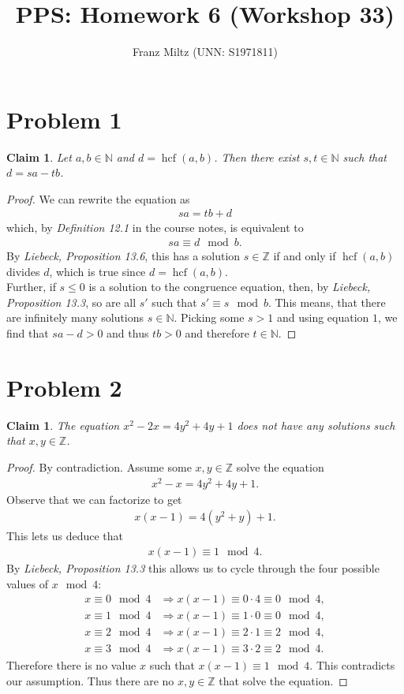\documentclass{article}
\title{PPS: Homework 6 (Workshop 33)}
\author{Franz Miltz (UNN: S1971811)}
\newcommand{\N}{\mathbb{N}}
\newcommand{\Z}{\mathbb{Z}}
\newtheorem{claim}[section]{Claim}
\DeclareMathOperator{\hcf}{hcf}
\begin{document}
\maketitle
\section*{Problem 1}
\begin{claim}
  Let $a,b\in\N$ and $d=\hcf(a,b)$. Then there exist $s,t\in\N$ such that $d=sa-tb$.
\end{claim}
\begin{proof}
  We can rewrite the equation as
  \begin{align}
    \label{eq:1}
    sa = tb + d
  \end{align}
  which, by \emph{Definition 12.1} in the course notes, is equivalent to
  \begin{align*}
    sa \equiv d \mod b.
  \end{align*}
  By \emph{Liebeck, Proposition 13.6}, this has a solution $s\in\Z$ if and only if $\hcf(a,b)$ divides $d$, which is true since $d=\hcf(a,b)$.\\
  Further, if $s\leq 0$ is a solution to the congruence equation, then, by \emph{Liebeck, Proposition 13.3}, so are all $s'$ such that $s' \equiv s \mod b$.
  This means, that there are infinitely many solutions $s\in\N$.
  Picking some $s>1$ and using equation $1$, we find that $sa-d>0$ and thus $tb>0$ and therefore $t\in\N$.
\end{proof}
\section*{Problem 2}
\begin{claim}
  The equation $x^2-2x=4y^2+4y+1$ does not have any solutions such that $x,y\in\Z$.
\end{claim}
\begin{proof}
  By contradiction. Assume some $x,y\in\Z$ solve the equation
  \begin{align*}
    x^2-x=4y^2+4y+1.
  \end{align*}
  Observe that we can factorize to get
  \begin{align*}
    x(x-1)=4(y^2+y)+1.
  \end{align*}
  This lets us deduce that
  \begin{align*}
    x(x-1) \equiv 1 \mod 4.
  \end{align*}
  By \emph{Liebeck, Proposition 13.3} this allows us to cycle through the four possible values of $x\mod 4$:
  \begin{align*}
    x\equiv 0 \mod 4 &\Rightarrow x(x-1) \equiv 0\cdot 4 \equiv 0 \mod 4,\\
    x\equiv 1 \mod 4 &\Rightarrow x(x-1) \equiv 1\cdot 0 \equiv 0 \mod 4,\\
    x\equiv 2 \mod 4 &\Rightarrow x(x-1) \equiv 2\cdot 1 \equiv 2 \mod 4,\\
    x\equiv 3 \mod 4 &\Rightarrow x(x-1) \equiv 3\cdot 2 \equiv 2 \mod 4.
  \end{align*}
  Therefore there is no value $x$ such that $x(x-1)\equiv 1 \mod 4$.
  This contradicts our assumption.
  Thus there are no $x,y\in\Z$ that solve the equation.
\end{proof}
\end{document}
